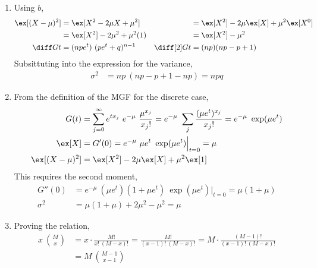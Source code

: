 \begin{enumerate}
\begin{enumerate}
              \item Using $ b $,
                    \begin{align}
                        \ex[(X-\mu)^2] & = \ex[X^2 - 2\mu X + \mu^2]               &
                                       & = \ex[X^2] - 2\mu \ex[X] + \mu^2 \ex[X^0]   \\
                                       & = \ex[X^2] - 2\mu^2 + \mu^2 (1)           &
                                       & = \ex[X^2] - \mu^2                          \\
                        \diff Gt       & = (npe^t)\ (pe^t + q)^{n-1}               &
                        \diff[2] Gt    & = (np)(np - p + 1)
                    \end{align}
                    Subsittuting into the expression for the variance,
                    \begin{align}
                        \sigma^2 & = np\ (np - p + 1 - np) = npq
                    \end{align}

              \item From the definition of the MGF for the discrete case,
                    \begin{align}
                        G(t)           & = \sum_{j=0}^{\infty} e^{tx_j}\ e^{-\mu}
                        \ \frac{\mu^{x_j}}{x_j!} = e^{-\mu}\ \sum_j
                        \frac{(\mu e^t)^{x_j}}{x_j!} = e^{-\mu}\ \exp(\mu e^t)    \\
                        \ex[X]         & = G'(0) = e^{-\mu}\ \mu e^t
                        \ \exp(\mu e^t)\Big|_{t=0} = \mu                          \\
                        \ex[(X-\mu)^2] & = \ex[X^2] - 2\mu \ex[X] + \mu^2 \ex[1]
                    \end{align}
                    This requires the second moment,
                    \begin{align}
                        G''(0)   & = e^{-\mu}\ (\mu e^t)(1 + \mu e^t)\
                        \exp(\mu e^t) \Big|_{t=0} = \mu (1+\mu)          \\
                        \sigma^2 & = \mu(1 + \mu) + 2\mu^2 - \mu^2 = \mu
                    \end{align}

              \item Proving the relation,
                    \begin{align}
                        x\ \binom{M}{x} & = x \cdot \frac{M!}{x!\ (M-x)!}
                        = \frac{M!}{(x-1)!\ (M-x)!}
                        = M \cdot \frac{(M-1)!}{(x-1)!\ (M-x)!}           \\
                                        & = M\ \binom{M-1}{x-1}
                    \end{align}


\end{enumerate}
\end{enumerate}
